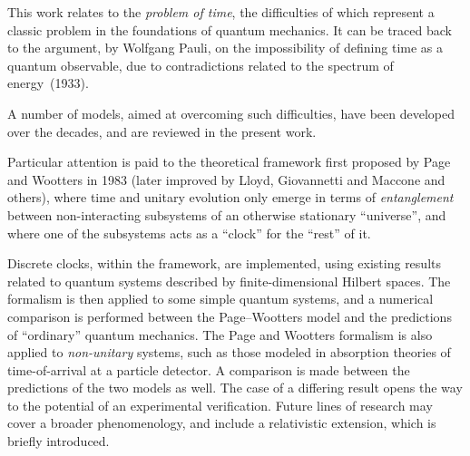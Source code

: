 This work relates to the
\emph{problem of time},
the difficulties of which
represent a classic problem in the foundations of quantum mechanics.
It can be traced back to
the argument, by Wolfgang Pauli,
on the impossibility of defining time as a quantum observable,
due to contradictions related to the spectrum of energy~(1933).

A number of models, aimed at overcoming such difficulties,
have been developed over the decades,
and are reviewed in the present work.

Particular attention is paid to
the theoretical framework first proposed by Page and Wootters in 1983
(later improved by Lloyd, Giovannetti and Maccone and others),
where time and unitary evolution only emerge in
terms of \emph{entanglement} between non-interacting subsystems
of an otherwise stationary ``universe'',
and where one of the subsystems acts as a ``clock'' for the ``rest'' of it.

{Discrete} clocks, within the framework, are implemented,
using
existing results related to quantum systems described by finite-dimensional Hilbert spaces.
The formalism is then applied to some simple quantum systems,
and a numerical comparison is performed between the Page--Wootters model and the predictions
of ``ordinary'' quantum mechanics.
The Page and Wootters formalism is also applied to \emph{non-unitary} systems,
such as those modeled in absorption theories of time-of-arrival at a particle detector.
A comparison is made between the predictions of the two models as well.
The case of a differing result
opens the way to the potential of an experimental verification.
%
Future lines of research may cover a broader phenomenology,
and include a relativistic extension,
which is briefly introduced.
